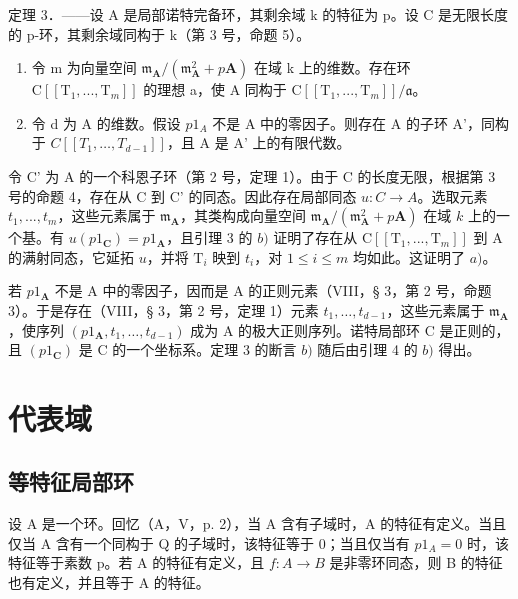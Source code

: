 定理 3．——设 A 是局部诺特完备环，其剩余域 k 的特征为 p。设 C 是无限长度的 p-环，其剩余域同构于 k（第 3 号，命题 5）。

\begin{enumerate}
\def\labelenumi{\alph{enumi})}
\item
  令 m 为向量空间 \(\mathfrak{m}_{\mathbf{A}}/(\mathfrak{m}_{\mathbf{A}}^{2} + p\mathbf{A})\) 在域 k 上的维数。存在环 \(\mathrm{C}[[\mathrm{T}_{1}, ..., \mathrm{T}_{m}]]\) 的理想 a，使 A 同构于 \(\mathrm{C}[[\mathrm{T}_{1}, ..., \mathrm{T}_{m}]]/\mathfrak{a}\)。
\item
  令 d 为 A 的维数。假设 \(p1_{A}\) 不是 A 中的零因子。则存在 A 的子环 A'，同构于 \(C[[T_{1}, \ldots, T_{d-1}]]\)，且 A 是 A' 上的有限代数。
\end{enumerate}

令 C' 为 A 的一个科恩子环（第 2 号，定理 1）。由于 C 的长度无限，根据第 3 号的命题 4，存在从 C 到 C' 的同态。因此存在局部同态 \(u:C\to A\)。选取元素 \(t_{1},...,t_{m}\)，这些元素属于 \(\mathfrak{m}_{\mathbf{A}}\)，其类构成向量空间 \(\mathfrak{m}_{\mathbf{A}}/(\mathfrak{m}_{\mathbf{A}}^{2}+p\mathbf{A})\) 在域 \(k\) 上的一个基。有 \(u(p1_{\mathbf{C}})=p1_{\mathbf{A}}\)，且引理 3 的 \(b)\) 证明了存在从 \(\mathrm{C}[[\mathrm{T}_{1},..., \mathrm{T}_{m}]]\) 到 A 的满射同态，它延拓 \(u\)，并将 \(\mathrm{T}_{i}\) 映到 \(t_{i}\)，对 \(1\leqslant i\leqslant m\) 均如此。这证明了 \(a)\)。

若 \(p1_{\mathbf{A}}\) 不是 A 中的零因子，因而是 A 的正则元素（VIII，§ 3，第 2 号，命题 3）。于是存在（VIII，§ 3，第 2 号，定理 1）元素 \(t_1, \ldots, t_{d-1}\)，这些元素属于 \(\mathfrak{m}_{\mathbf{A}}\)，使序列 \((p1_{\mathbf{A}}, t_1, \ldots, t_{d-1})\) 成为 A 的极大正则序列。诺特局部环 C 是正则的，且 \((p1_{\mathbf{C}})\) 是 C 的一个坐标系。定理 3 的断言 \(b)\) 随后由引理 4 的 \(b)\) 得出。

\section{代表域}

\subsection{等特征局部环}

设 A 是一个环。回忆（A，V，p. 2），当 A 含有子域时，A 的特征有定义。当且仅当 A 含有一个同构于 Q 的子域时，该特征等于 0；当且仅当有 \(p1_{A} = 0\) 时，该特征等于素数 p。若 A 的特征有定义，且 \(f: A \to B\) 是非零环同态，则 B 的特征也有定义，并且等于 A 的特征。

